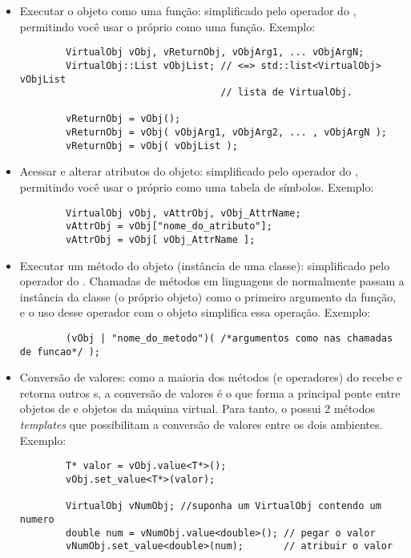   \begin{itemize}
    \item Executar o objeto como uma função: simplificado pelo operador \lang{()}
      do \CXX{}, permitindo você usar o próprio \VObj{} como uma função. Exemplo:
      \begin{lstlisting}
        VirtualObj vObj, vReturnObj, vObjArg1, ... vObjArgN; 
        VirtualObj::List vObjList; // <=> std::list<VirtualObj> vObjList
                                   // lista de VirtualObj.
                                   
        vReturnObj = vObj();
        vReturnObj = vObj( vObjArg1, vObjArg2, ... , vObjArgN );
        vReturnObj = vObj( vObjList );
      \end{lstlisting}
    \item Acessar e alterar atributos do objeto: simplificado pelo operador
      \lang{[]} do \CXX{}, permitindo você usar o próprio \VObj{} como uma
      tabela de símbolos. Exemplo:
      \begin{lstlisting}
        VirtualObj vObj, vAttrObj, vObj_AttrName;
        vAttrObj = vObj["nome_do_atributo"];
        vAttrObj = vObj[ vObj_AttrName ];
      \end{lstlisting}
    \item Executar um método do objeto (instância de uma classe): simplificado pelo
      operador \lang{|} do \CXX{}. Chamadas de métodos em linguagens de \script{} normalmente
      passam a instância da classe (o próprio objeto) como o primeiro argumento da
      função, e o uso desse operador com o objeto simplifica essa operação. Exemplo: 
      \begin{lstlisting}
        (vObj | "nome_do_metodo")( /*argumentos como nas chamadas de funcao*/ );
      \end{lstlisting}
    \item Conversão de valores: como a maioria dos métodos (e operadores) do
      \VObj{} recebe e retorna outros \VObj{}s, a conversão de valores é o que forma a
      principal ponte entre objetos de \CXX{} e objetos da máquina virtual. Para tanto, o \VObj{}
      possui 2 métodos \textit{templates} que possibilitam a conversão de valores entre
      os dois ambientes. Exemplo:
      \begin{lstlisting}
        T* valor = vObj.value<T*>();
        vObj.set_value<T*>(valor);
        
        VirtualObj vNumObj; //suponha um VirtualObj contendo um numero
        double num = vNumObj.value<double>(); // pegar o valor
        vNumObj.set_value<double>(num);       // atribuir o valor
      \end{lstlisting}
  \end{itemize}

